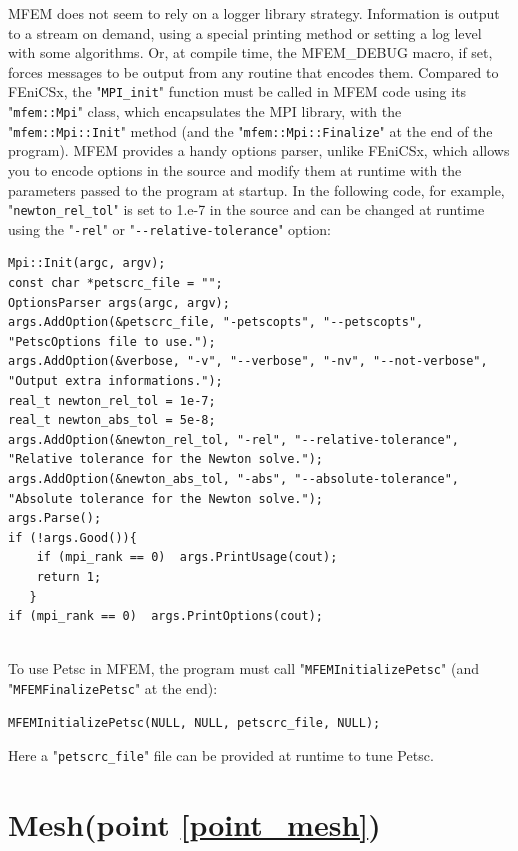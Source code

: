 \documentclass[12pt]{article}
\newcommand{\f}[1]{FEniCSx#1}
\newcommand{\mycode}[1]{\textsf{"}\lstinline`#1`\textsf{"}}
\begin{document}
MFEM does not seem to rely on a  logger library strategy. Information is output to a stream on demand, using a special printing method or setting a log level with some algorithms. Or, at compile time, the MFEM\_DEBUG macro, if set, forces messages to be output from any routine that encodes them.
Compared to \f{}, the \mycode{MPI_init} function must be called in MFEM code using its \mycode{mfem::Mpi} class, which encapsulates the MPI library, with the \mycode{mfem::Mpi::Init} method (and the \mycode{mfem::Mpi::Finalize} at the end of the program).
MFEM provides a handy options parser, unlike \f{}, which allows you to encode options in the source and modify them at runtime with the parameters passed to the program at startup.
In the following code, for example, \mycode{newton_rel_tol} is set to 1.e-7 in the source and can be changed at runtime using the \mycode{-rel} or \mycode{--relative-tolerance} option:
\begin{lstlisting}[numbers=none,basicstyle=\scriptsize]
Mpi::Init(argc, argv);
const char *petscrc_file = "";
OptionsParser args(argc, argv);
args.AddOption(&petscrc_file, "-petscopts", "--petscopts", "PetscOptions file to use.");
args.AddOption(&verbose, "-v", "--verbose", "-nv", "--not-verbose", "Output extra informations.");
real_t newton_rel_tol = 1e-7;
real_t newton_abs_tol = 5e-8;
args.AddOption(&newton_rel_tol, "-rel", "--relative-tolerance", "Relative tolerance for the Newton solve.");
args.AddOption(&newton_abs_tol, "-abs", "--absolute-tolerance", "Absolute tolerance for the Newton solve.");
args.Parse();
if (!args.Good()){
   	if (mpi_rank == 0)  args.PrintUsage(cout);
   	return 1;
   }
if (mpi_rank == 0)  args.PrintOptions(cout);
   
\end{lstlisting}
To use Petsc in MFEM, the program must call \mycode{MFEMInitializePetsc} (and \mycode{MFEMFinalizePetsc} at the end):
\begin{lstlisting}[numbers=none,basicstyle=\scriptsize]
MFEMInitializePetsc(NULL, NULL, petscrc_file, NULL);   
\end{lstlisting}
Here a \mycode{petscrc_file} file can be provided at runtime to tune Petsc.

\section{Mesh(point \ref{point_mesh})\label{Mesh}}
\end{document}
